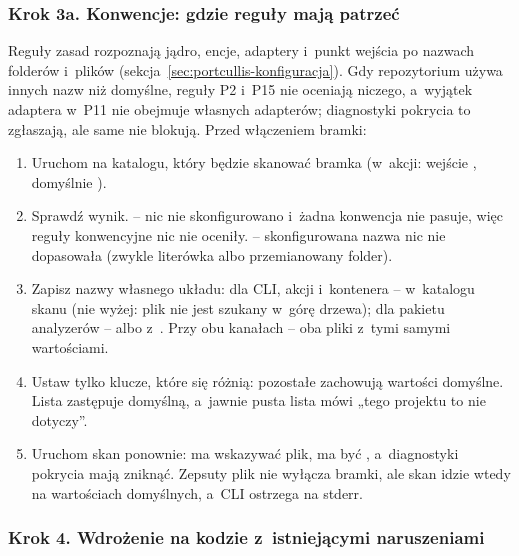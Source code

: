 \subsubsection{Krok 3a. Konwencje: gdzie reguły mają patrzeć}\label{sec:portcullis-tutorial-konwencje}

Reguły zasad rozpoznają jądro, encje, adaptery i~punkt wejścia po nazwach folderów i~plików
(sekcja~\ref{sec:portcullis-konfiguracja}). Gdy repozytorium używa innych nazw niż
domyślne, reguły P2 i~P15 nie oceniają niczego, a~wyjątek adaptera w~P11 nie obejmuje
własnych adapterów; diagnostyki pokrycia to zgłaszają, ale same nie blokują. Przed
włączeniem bramki:
\begin{enumerate}[leftmargin=*]
  \item Uruchom  na katalogu, który będzie skanować bramka
        (w~akcji: wejście , domyślnie ).
  \item Sprawdź wynik.  -- nic nie skonfigurowano
        i~żadna konwencja nie pasuje, więc reguły konwencyjne nic nie oceniły.
         -- skonfigurowana nazwa nic nie dopasowała
        (zwykle literówka albo przemianowany folder).
  \item Zapisz nazwy własnego układu: dla CLI, akcji i~kontenera -- 
        w~katalogu skanu (nie wyżej: plik nie jest szukany w~górę drzewa); dla pakietu
        analyzerów --  albo 
        z~. Przy obu kanałach -- oba pliki z~tymi samymi
        wartościami.
  \item Ustaw tylko klucze, które się różnią: pozostałe zachowują wartości domyślne. Lista
        zastępuje domyślną, a~jawnie pusta lista mówi „tego projektu to nie dotyczy”.
  \item Uruchom skan ponownie:  ma wskazywać plik,
         ma być , a~diagnostyki pokrycia mają
        zniknąć. Zepsuty plik nie wyłącza bramki, ale skan idzie wtedy na wartościach
        domyślnych, a~CLI ostrzega na stderr.
\end{enumerate}

\subsubsection{Krok 4. Wdrożenie na kodzie z~istniejącymi naruszeniami}


